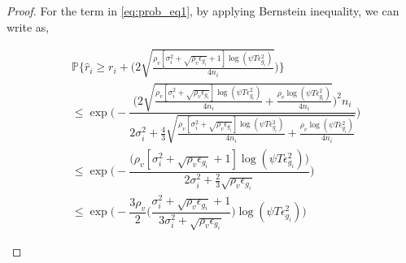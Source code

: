 \begin{proof}
For the term in \ref{eq:prob_eq1}, by applying Bernstein inequality, we can write as,
\begin{small}
\begin{align*}
&\mathbb{P}\bigg\lbrace \hat{r}_{i}\geq r_{i} + \bigg(2\sqrt{\frac{\rho_v [\sigma_{i}^{2}+\sqrt{\rho_{v}\epsilon_{g_{i}}} + 1]\log(\psi T\epsilon_{g_{i}}^{2})}{4n_{i}}  } \bigg)\bigg\rbrace\\
&\leq \exp\bigg(- \dfrac{\bigg(2\sqrt{\frac{\rho_v [\sigma_{i}^{2}+\sqrt{\rho_{v}\epsilon_{g_{i}}}]\log(\psi T\epsilon_{g_{i}}^{2})}{4n_{i}} + \frac{\rho_v \log{(\psi T\epsilon_{g_{i}}^{2})}}{4 n_{i}}}\bigg)^{2}n_{i}}{2\sigma_{i}^{2}+\frac{4}{3}\sqrt{\frac{\rho_v [\sigma_{i}^{2}+\sqrt{\rho_{v}\epsilon_{g_{i}}}]\log(\psi T\epsilon_{g_{i}}^{2})}{4n_{i}}+\frac{\rho_v \log{(\psi T\epsilon_{g_{i}}^{2})}}{4 n_{i}}}}\bigg) \\
&\leq \exp\bigg(- \dfrac{\bigg(\rho_v [\sigma_{i}^{2}+\sqrt{\rho_{v}\epsilon_{g_{i}}} + 1]\log(\psi T\epsilon_{g_{i}}^{2})\bigg)}{2\sigma_{i}^{2}+\frac{2}{3}\sqrt{\rho_v \epsilon_{g_{i}}}} \bigg)\\
&\leq \exp\bigg(- \dfrac{3\rho_v}{2} \bigg(\dfrac{\sigma_{i}^{2}+\sqrt{\rho_{v}\epsilon_{g_{i}}}+1}{3\sigma_{i}^{2}+\sqrt{\rho_v \epsilon_{g_{i}}}}\bigg) \log(\psi T\epsilon_{g_{i}}^{2}) \bigg) 
\end{align*}
\end{small}
 

\end{proof}
